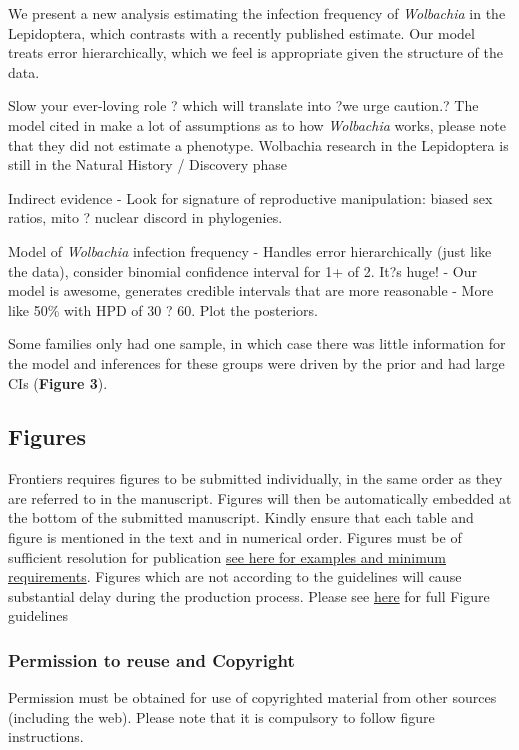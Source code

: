 \documentclass{frontiersSCNS} %
\begin{document}
We present a new analysis estimating the infection frequency of \textit{Wolbachia} in the Lepidoptera, which contrasts with a recently published estimate. Our model treats error hierarchically, which we feel is appropriate given the structure of the data. 

Slow your ever-loving role ? which will translate into ?we urge caution.?
The model cited in \citet{Nice:2009p7399} make a lot of assumptions as to how \textit{Wolbachia} works, please note that they did not estimate a phenotype.
Wolbachia research in the Lepidoptera is still in the Natural History / Discovery phase

Indirect evidence - Look for signature of reproductive manipulation: biased sex ratios, mito ? nuclear discord in phylogenies. 


Model of \textit{Wolbachia} infection frequency - Handles error hierarchically (just like the data), consider binomial confidence interval for 1+ of 2. It?s huge! - Our model is awesome, generates credible intervals that are more reasonable - More like 50\% with HPD of 30 ? 60. Plot the posteriors. 


Some families only had one sample, in which case there was little information for the model and inferences for these groups were driven by the prior and had large CIs (\textbf{Figure 3}).



\subsection{Figures}
Frontiers requires figures to be submitted individually, in the same order as they are referred to in the manuscript. Figures will then be automatically embedded at the bottom of the submitted manuscript. Kindly ensure that each table and figure is mentioned in the text and in numerical order. Figures must be of sufficient resolution for publication \href{http://home.frontiersin.org/about/author-guidelines#ResolutionRequirements}{see here for examples and minimum requirements}. Figures which are not according to the guidelines will cause substantial delay during the production process. Please see \href{http://home.frontiersin.org/about/author-guidelines#GeneralStyleGuidelinesforFigures}{here} for full Figure guidelines


\subsubsection{Permission to reuse and Copyright}
Permission must be obtained for use of copyrighted material from other sources (including the web). Please note that it is compulsory to follow figure instructions. 
\end{document}
